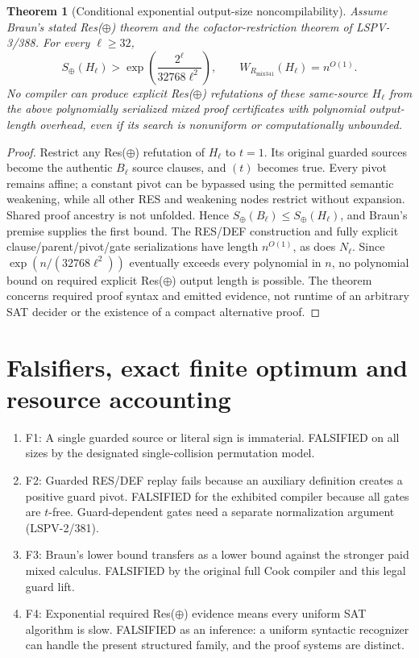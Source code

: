 \documentclass[11pt]{article}
\newtheorem{theorem}{Theorem}
\begin{document}
\begin{theorem}[Conditional exponential output-size noncompilability]
Assume Braun's stated Res($\oplus$) theorem and the cofactor-restriction theorem of LSPV-3/388. For every $\ell\ge32$,
\[
\boxed{S_\oplus(H_\ell)>\exp\left(\frac{2^\ell}{32768\ell^2}\right),\qquad
W_{R_{\mathrm{mix341}}}(H_\ell)=n^{O(1)}.}
\]
No compiler can produce explicit Res($\oplus$) refutations of these same-source $H_\ell$ from the above polynomially serialized mixed proof certificates with polynomial \emph{output-length} overhead, even if its search is nonuniform or computationally unbounded.
\end{theorem}
\begin{proof}
Restrict any Res($\oplus$) refutation of $H_\ell$ to $t=1$. Its original guarded sources become the authentic $B_\ell$ source clauses, and $(t)$ becomes true. Every pivot remains affine; a constant pivot can be bypassed using the permitted semantic weakening, while all other RES and weakening nodes restrict without expansion. Shared proof ancestry is not unfolded. Hence $S_\oplus(B_\ell)\le S_\oplus(H_\ell)$, and Braun's premise supplies the first bound. The RES/DEF construction and fully explicit clause/parent/pivot/gate serializations have length $n^{O(1)}$, as does $N_\ell$. Since $\exp(n/(32768\ell^2))$ eventually exceeds every polynomial in $n$, no polynomial bound on required explicit Res($\oplus$) output length is possible. The theorem concerns required proof syntax and emitted evidence, not runtime of an arbitrary SAT decider or the existence of a compact alternative proof.
\end{proof}

\section*{Falsifiers, exact finite optimum and resource accounting}
\begin{enumerate}
\item[] F1: A single guarded source or literal sign is immaterial. FALSIFIED on all sizes by the designated single-collision permutation model.
\item[] F2: Guarded RES/DEF replay fails because an auxiliary definition creates a positive guard pivot. FALSIFIED for the exhibited compiler because all gates are $t$-free. Guard-dependent gates need a separate normalization argument (LSPV-2/381).
\item[] F3: Braun's lower bound transfers as a lower bound against the stronger paid mixed calculus. FALSIFIED by the original full Cook compiler and this legal guard lift.
\item[] F4: Exponential required Res($\oplus$) evidence means every uniform SAT algorithm is slow. FALSIFIED as an inference: a uniform syntactic recognizer can handle the present structured family, and the proof systems are distinct.
\end{enumerate}
\end{document}

